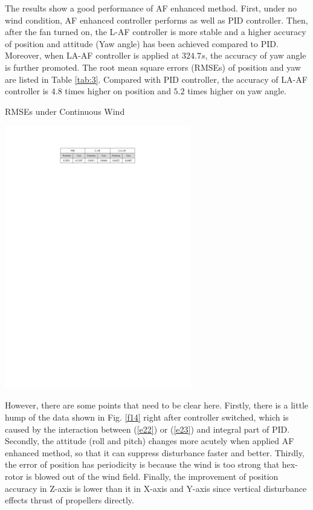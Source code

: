 \documentclass[letterpaper, 10 pt, conference]{ieeeconf}  %
\begin{document}
The results show a good performance of AF enhanced method.
First, under no wind condition, AF enhanced controller performs as well as PID controller.
Then, after the fan turned on, the L-AF controller is more stable and a higher accuracy of position and attitude (Yaw angle) has been achieved compared to PID.
Moreover, when LA-AF controller is applied at $324.7s$, the accuracy of yaw angle is further promoted.
The root mean square errors (RMSEs) of position and yaw are listed in Table \ref{tab:3}.
Compared with PID controller, the accuracy of LA-AF controller is $4.8$ times higher on position and $5.2$ times higher on yaw angle.
\begin{table}[t]
    \caption{RMSEs under Continuous Wind}
    \includegraphics[width=3.2in]{illustrations/tab3.pdf}
    \centering
    \label{tab:3}
\end{table}

However, there are some points that need to be clear here.
Firstly, there is a little hump of the data shown in Fig. \ref{f14} right after controller switched, which is caused by the interaction between (\ref{e22}) or (\ref{e23}) and integral part of PID.
Secondly, the attitude (roll and pitch) changes more acutely when applied AF enhanced method, so that it can suppress disturbance faster and better.
Thirdly, the error of position has periodicity is because the wind is too strong that hex-rotor is blowed out of the wind field.
Finally, the improvement of position accuracy in Z-axis is lower than it in X-axis and Y-axis since vertical disturbance effects thrust of propellers directly.
\end{document}
